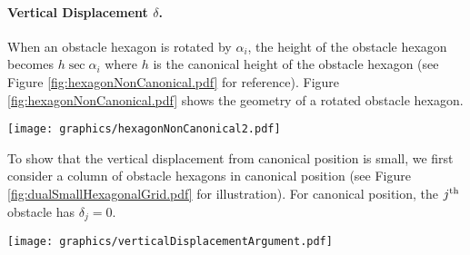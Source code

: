 \paragraph{Vertical Displacement $\delta$.}

When an obstacle hexagon is rotated by $\alpha_i$, the height of the obstacle hexagon becomes $h \sec \alpha_i$ where $h$ is the canonical height of the obstacle hexagon (see Figure \ref{fig:hexagonNonCanonical.pdf} for reference).
Figure \ref{fig:hexagonNonCanonical.pdf} shows the geometry of a rotated obstacle hexagon.

\begin{minipage}{\linewidth}
\begin{center}
\texttt{[image: graphics/hexagonNonCanonical2.pdf]}
\label{fig:hexagonNonCanonical.pdf}
\end{center}
\end{minipage}

To show that the vertical displacement from canonical position is small, we first consider a column of obstacle hexagons in canonical position (see Figure \ref{fig:dualSmallHexagonalGrid.pdf} for illustration).  
For canonical position, the $j^\text{th}$ obstacle has $\delta_j = 0$.

\begin{minipage}{\linewidth}
\begin{center}
\texttt{[image: graphics/verticalDisplacementArgument.pdf]}
\label{fig:verticalDisplacementArgument.pdf}
\end{center}
\end{minipage}

